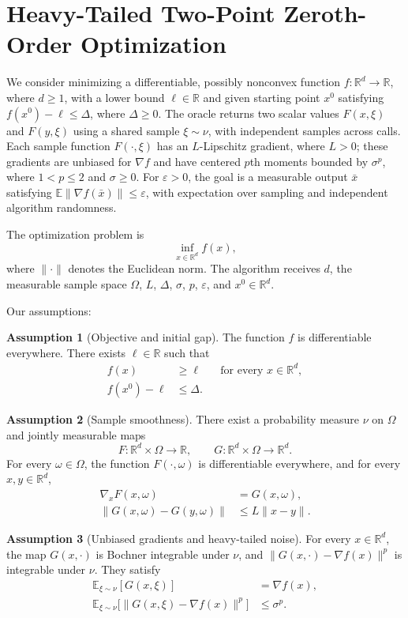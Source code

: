 \documentclass[10pt]{article}
\theoremstyle{definition}
\newtheorem{assumption}{Assumption}
\begin{document}
\section*{Heavy-Tailed Two-Point Zeroth-Order Optimization}
We consider minimizing a differentiable, possibly nonconvex function $f:\mathbb{R}^d\to\mathbb{R}$, where $d\geq1$, with a lower bound $\ell\in\mathbb{R}$ and given starting point $x^0$ satisfying $f(x^0)-\ell\leq\Delta$, where $\Delta\geq0$. The oracle returns two scalar values $F(x,\xi)$ and $F(y,\xi)$ using a shared sample $\xi\sim\nu$, with independent samples across calls. Each sample function $F(\cdot,\xi)$ has an $L$-Lipschitz gradient, where $L>0$; these gradients are unbiased for $\nabla f$ and have centered $p$th moments bounded by $\sigma^p$, where $1<p\leq2$ and $\sigma\geq0$. For $\varepsilon>0$, the goal is a measurable output $\bar{x}$ satisfying $\mathbb{E}\|\nabla f(\bar{x})\|\leq\varepsilon$, with expectation over sampling and independent algorithm randomness.

The optimization problem is
\[
\inf_{x\in\mathbb{R}^d} f(x),
\]
where $\|\cdot\|$ denotes the Euclidean norm. The algorithm receives $d$, the measurable sample space $\Omega$, $L$, $\Delta$, $\sigma$, $p$, $\varepsilon$, and $x^0\in\mathbb{R}^d$.

Our assumptions:
\begin{assumption}[Objective and initial gap]
The function $f$ is differentiable everywhere. There exists $\ell\in\mathbb{R}$ such that
\[
\begin{aligned}
f(x)&\geq\ell &&\text{for every }x\in\mathbb{R}^d,\\
f(x^0)-\ell&\leq\Delta.
\end{aligned}
\]
\end{assumption}

\begin{assumption}[Sample smoothness]
There exist a probability measure $\nu$ on $\Omega$ and jointly measurable maps
\[
F:\mathbb{R}^d\times\Omega\to\mathbb{R},
\qquad
G:\mathbb{R}^d\times\Omega\to\mathbb{R}^d.
\]
For every $\omega\in\Omega$, the function $F(\cdot,\omega)$ is differentiable everywhere, and for every $x,y\in\mathbb{R}^d$,
\[
\begin{aligned}
\nabla_x F(x,\omega)&=G(x,\omega),\\
\|G(x,\omega)-G(y,\omega)\|&\leq L\|x-y\|.
\end{aligned}
\]
\end{assumption}

\begin{assumption}[Unbiased gradients and heavy-tailed noise]
For every $x\in\mathbb{R}^d$, the map $G(x,\cdot)$ is Bochner integrable under $\nu$, and $\|G(x,\cdot)-\nabla f(x)\|^p$ is integrable under $\nu$. They satisfy
\[
\begin{aligned}
\mathbb{E}_{\xi\sim\nu}[G(x,\xi)]&=\nabla f(x),\\
\mathbb{E}_{\xi\sim\nu}\bigl[\|G(x,\xi)-\nabla f(x)\|^p\bigr]&\leq\sigma^p.
\end{aligned}
\]
\end{assumption}
\end{document}
